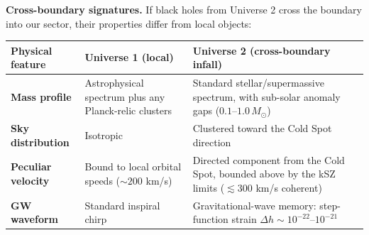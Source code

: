 \documentclass[
]{article}
\begin{document}
\textbf{Cross-boundary signatures.} If black holes from Universe 2 cross
the boundary into our sector, their properties differ from local
objects:

\begin{longtable}[]{@{}lll@{}}
\toprule
\begin{minipage}[b]{0.30\columnwidth}\raggedright
Physical feature\strut
\end{minipage} & \begin{minipage}[b]{0.30\columnwidth}\raggedright
Universe 1 (local)\strut
\end{minipage} & \begin{minipage}[b]{0.30\columnwidth}\raggedright
Universe 2 (cross-boundary infall)\strut
\end{minipage}\tabularnewline
\midrule
\endhead
\begin{minipage}[t]{0.30\columnwidth}\raggedright
\textbf{Mass profile}\strut
\end{minipage} & \begin{minipage}[t]{0.30\columnwidth}\raggedright
Astrophysical spectrum plus any Planck-relic clusters\strut
\end{minipage} & \begin{minipage}[t]{0.30\columnwidth}\raggedright
Standard stellar/supermassive spectrum, with sub-solar anomaly gaps
(\(0.1\)--\(1.0\,M_\odot\))\strut
\end{minipage}\tabularnewline
\begin{minipage}[t]{0.30\columnwidth}\raggedright
\textbf{Sky distribution}\strut
\end{minipage} & \begin{minipage}[t]{0.30\columnwidth}\raggedright
Isotropic\strut
\end{minipage} & \begin{minipage}[t]{0.30\columnwidth}\raggedright
Clustered toward the Cold Spot direction\strut
\end{minipage}\tabularnewline
\begin{minipage}[t]{0.30\columnwidth}\raggedright
\textbf{Peculiar velocity}\strut
\end{minipage} & \begin{minipage}[t]{0.30\columnwidth}\raggedright
Bound to local orbital speeds (\(\sim\!200\) km/s)\strut
\end{minipage} & \begin{minipage}[t]{0.30\columnwidth}\raggedright
Directed component from the Cold Spot, bounded above by the kSZ limits
(\(\lesssim 300\) km/s coherent)\strut
\end{minipage}\tabularnewline
\begin{minipage}[t]{0.30\columnwidth}\raggedright
\textbf{GW waveform}\strut
\end{minipage} & \begin{minipage}[t]{0.30\columnwidth}\raggedright
Standard inspiral chirp\strut
\end{minipage} & \begin{minipage}[t]{0.30\columnwidth}\raggedright
Gravitational-wave memory: step-function strain
\(\Delta h \sim 10^{-22}\)--\(10^{-21}\)\strut
\end{minipage}\tabularnewline
\bottomrule
\end{longtable}
\end{document}
